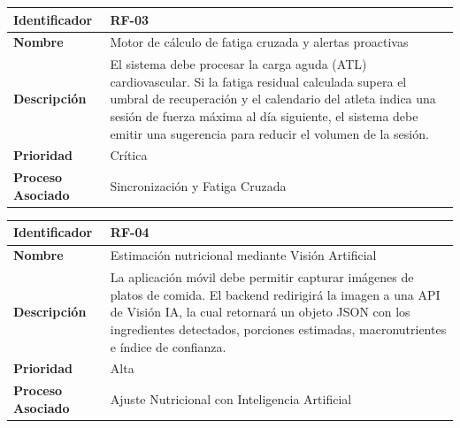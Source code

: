\documentclass[12pt]{article}
\begin{document}
\begin{table}[h!]
    \centering
    \renewcommand{\arraystretch}{1.3}
    \begin{tabular}{|p{3.5cm}|p{11.5cm}|}
        \hline
        \rowcolor[HTML]{EFEFEF} 
        \textbf{Identificador} & \textbf{RF-03} \\ \hline
        \textbf{Nombre} & Motor de cálculo de fatiga cruzada y alertas proactivas \\ \hline
        \textbf{Descripción} & El sistema debe procesar la carga aguda (ATL) cardiovascular. Si la fatiga residual calculada supera el umbral de recuperación y el calendario del atleta indica una sesión de fuerza máxima al día siguiente, el sistema debe emitir una sugerencia para reducir el volumen de la sesión. \\ \hline
        \textbf{Prioridad} & Crítica \\ \hline
        \textbf{Proceso Asociado} & Sincronización y Fatiga Cruzada \\ \hline
    \end{tabular}
\end{table}
\newpage
\begin{table}[h!]
    \centering
    \renewcommand{\arraystretch}{1.3}
    \begin{tabular}{|p{3.5cm}|p{11.5cm}|}
        \hline
        \rowcolor[HTML]{EFEFEF} 
        \textbf{Identificador} & \textbf{RF-04} \\ \hline
        \textbf{Nombre} & Estimación nutricional mediante Visión Artificial \\ \hline
        \textbf{Descripción} & La aplicación móvil debe permitir capturar imágenes de platos de comida. El backend redirigirá la imagen a una API de Visión IA, la cual retornará un objeto JSON con los ingredientes detectados, porciones estimadas, macronutrientes e índice de confianza. \\ \hline
        \textbf{Prioridad} & Alta \\ \hline
        \textbf{Proceso Asociado} & Ajuste Nutricional con Inteligencia Artificial \\ \hline
    \end{tabular}
\end{table}
\end{document}
